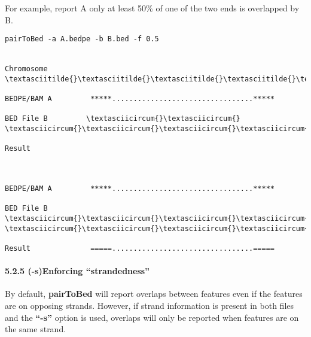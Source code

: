 \documentclass[letterpaper,10pt,english]{sphinxmanual}
\begin{document}
For example, report A only at least 50\% of one of the two ends is overlapped by B.

\begin{Verbatim}[commandchars=\\\{\}]
pairToBed -a A.bedpe -b B.bed -f 0.5


Chromosome  \textasciitilde{}\textasciitilde{}\textasciitilde{}\textasciitilde{}\textasciitilde{}\textasciitilde{}\textasciitilde{}\textasciitilde{}\textasciitilde{}\textasciitilde{}\textasciitilde{}\textasciitilde{}\textasciitilde{}\textasciitilde{}\textasciitilde{}\textasciitilde{}\textasciitilde{}\textasciitilde{}\textasciitilde{}\textasciitilde{}\textasciitilde{}\textasciitilde{}\textasciitilde{}\textasciitilde{}\textasciitilde{}\textasciitilde{}\textasciitilde{}\textasciitilde{}\textasciitilde{}\textasciitilde{}\textasciitilde{}\textasciitilde{}\textasciitilde{}\textasciitilde{}\textasciitilde{}\textasciitilde{}\textasciitilde{}\textasciitilde{}\textasciitilde{}\textasciitilde{}\textasciitilde{}\textasciitilde{}\textasciitilde{}\textasciitilde{}\textasciitilde{}\textasciitilde{}\textasciitilde{}\textasciitilde{}\textasciitilde{}\textasciitilde{}\textasciitilde{}\textasciitilde{}\textasciitilde{}\textasciitilde{}\textasciitilde{}\textasciitilde{}\textasciitilde{}\textasciitilde{}\textasciitilde{}\textasciitilde{}\textasciitilde{}\textasciitilde{}\textasciitilde{}\textasciitilde{}

BEDPE/BAM A         *****.................................*****

BED File B         \textasciicircum{}\textasciicircum{}                                           \textasciicircum{}\textasciicircum{}\textasciicircum{}\textasciicircum{}\textasciicircum{}\textasciicircum{}

Result



BEDPE/BAM A         *****.................................*****

BED File B         \textasciicircum{}\textasciicircum{}\textasciicircum{}\textasciicircum{}                                         \textasciicircum{}\textasciicircum{}\textasciicircum{}\textasciicircum{}\textasciicircum{}\textasciicircum{}

Result              =====.................................=====
\end{Verbatim}


\paragraph{5.2.5 (-s)Enforcing ``strandedness''}
\label{content/pairToBed:s-enforcing-strandedness}
By default, \textbf{pairToBed} will report overlaps between features even if the features are on opposing
strands. However, if strand information is present in both files and the \textbf{``-s''} option is used, overlaps will
only be reported when features are on the same strand.
\end{document}
